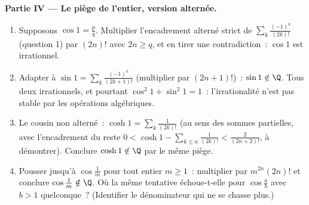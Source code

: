 \begin{problem}
\medskip
\noindent\textbf{Partie IV --- Le piège de l'entier, version
alternée.}
\begin{enumerate}[resume]
  \item Supposons $\cos 1 = \frac pq$. Multiplier l'encadrement
        alterné strict de $\sum_{k}
        \frac{(-1)^k}{(2k)!}$ (question 1) par $(2n)!$ avec $2n
        \geq q$, et en tirer une contradiction~: $\cos 1$ est
        irrationnel.
  \item Adapter à $\sin 1 = \sum_k \frac{(-1)^k}{(2k+1)!}$
        (multiplier par $(2n+1)!$)~: $\sin 1 \notin \Q$. Tous deux
        irrationnels, et pourtant $\cos^2 1 + \sin^2 1 = 1$~:
        l'irrationalité n'est pas stable par les opérations
        algébriques.
  \item Le cousin non alterné~: $\cosh 1 = \sum_k
        \frac{1}{(2k)!}$ (au sens des sommes partielles, avec
        l'encadrement du reste $0 < \cosh 1 - \sum_{k \leq n}
        \frac{1}{(2k)!} < \frac{2}{(2n+2)!}$, à démontrer).
        Conclure $\cosh 1 \notin \Q$ par le même piège.
  \item Pousser jusqu'à $\cos\frac 1m$ pour tout entier $m \geq 1$~:
        multiplier par $m^{2n}(2n)!$ et conclure $\cos\frac1m
        \notin \Q$. Où la même tentative échoue-t-elle pour
        $\cos\frac ab$ avec $b > 1$ quelconque~? (Identifier le
        dénominateur qui ne se chasse plus.)
\end{enumerate}


\end{problem}
